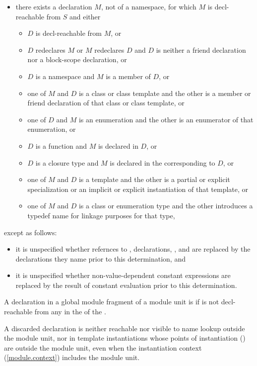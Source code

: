 \begin{std.txt}
\begin{itemize}
\item
there exists a declaration $M$, not of a namespace, for which
$M$ is decl-reachable from $S$ and either
\begin{itemize}
\item
$D$ is decl-reachable from $M$, or
\item
$D$ redeclares $M$ or $M$ redeclares $D$
and $D$ is neither a friend declaration
nor a block-scope declaration, or
\item
$D$ is a namespace and $M$ is a member of $D$, or
\item
one of $M$ and $D$ is a class or class template
and the other is a member or friend declaration
of that class or class template, or
\item
one of $D$ and $M$ is an enumeration
and the other is an enumerator of that enumeration, or
\item
$D$ is a function and $M$ is declared in $D$, or
\item
$D$ is a closure type and $M$ is declared in
the  corresponding to $D$, or
\item
one of $M$ and $D$ is a template and the other is
a partial or explicit specialization or
an implicit or explicit instantiation of that template, or
\item 
one of $M$ and $D$ is a class or enumeration type
and the other introduces a typedef name for linkage purposes for that type,
\end{itemize}
\end{itemize}
except as follows:
\begin{itemize}
\item
it is unspecified whether refernces to
,
 declarations,
, and
are replaced by the declarations they name
prior to this determination, and

\item
it is unspecified whether non-value-dependent
constant expressions are replaced by the result of
constant evaluation
prior to this determination.
\end{itemize}

\pnum
A declaration  in a global module fragment of a module unit
is  if 
is not decl-reachable from any 
in the 
of the .
\begin{note}
A discarded declaration is neither reachable
nor visible to name lookup outside the module unit,
nor in template instantiations whose points of instantiation
() are outside the module unit,
even when the instantiation context (\ref{module.context})
includes the module unit.
\end{note}


\end{std.txt}
